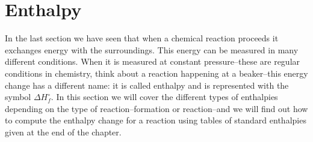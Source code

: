 \documentclass[main.tex]{subfiles}
\begin{document}
  \section{Enthalpy}
In the last section we have seen that when a chemical reaction proceeds it exchanges energy with the surroundings. This energy can be measured in many different conditions. When it is measured at constant pressure--these are regular conditions in chemistry, think about a reaction happening at a beaker--this energy change has a different name: it is called enthalpy and is represented with the symbol $\Delta H_f^{\circ}$. In this section we will cover the different types of enthalpies depending on the type of reaction--formation or reaction--and we will find out how to compute the enthalpy change for a reaction using tables of standard enthalpies given at the end of the chapter.
\end{document}
